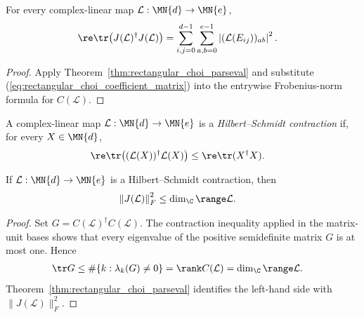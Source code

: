 \begin{theorem}
    \label{thm:rectangular_choi_parseval_matrix_units}
    \leanok
    For every complex-linear map $\mathcal L:\MN{d}\to\MN{e}$,
    \begin{align}
        \re\tr\!\left(J(\mathcal L)^\dagger J(\mathcal L)\right)
         & =
        \sum_{i,j=0}^{d-1}\sum_{a,b=0}^{e-1}
        \left|(\mathcal L(E_{ij}))_{ab}\right|^2.
        \label{eq:rectangular_choi_parseval_matrix_units}
    \end{align}
\end{theorem}

\begin{proof}\leanok
    Apply Theorem~\ref{thm:rectangular_choi_parseval} and substitute
    (\ref{eq:rectangular_choi_coefficient_matrix}) into the entrywise
    Frobenius-norm formula for $C(\mathcal L)$.
\end{proof}

\begin{definition}
    \label{def:rectangular_hilbert_schmidt_contraction}
    \leanok
    A complex-linear map $\mathcal L:\MN{d}\to\MN{e}$ is a
    \emph{Hilbert--Schmidt contraction} if, for every $X\in\MN{d}$,
    \begin{align}
        \re\tr\!\left((\mathcal L(X))^\dagger\mathcal L(X)\right)
         & \leq \re\tr(X^\dagger X).
        \label{eq:rectangular_hilbert_schmidt_contraction}
    \end{align}
\end{definition}

\begin{theorem}
    \label{thm:rectangular_choi_rank_bound}
    \leanok
    If $\mathcal L:\MN{d}\to\MN{e}$ is a Hilbert--Schmidt contraction, then
    \begin{align}
        \left\|J(\mathcal L)\right\|_F^2
         & \leq\dim_{\C}\range\mathcal L.
        \label{eq:rectangular_choi_rank_bound}
    \end{align}
\end{theorem}

\begin{proof}\leanok
    Set $G=C(\mathcal L)^\dagger C(\mathcal L)$. The contraction inequality
    applied in the matrix-unit bases shows that every eigenvalue of the
    positive semidefinite matrix $G$ is at most one. Hence
    \begin{align}
        \tr G
         & \leq\#\{k:\lambda_k(G)\neq0\}
        =\rank C(\mathcal L)
        =\dim_{\C}\range\mathcal L.
        \notag
    \end{align}
    Theorem~\ref{thm:rectangular_choi_parseval} identifies the left-hand side
    with $\|J(\mathcal L)\|_F^2$.
\end{proof}
